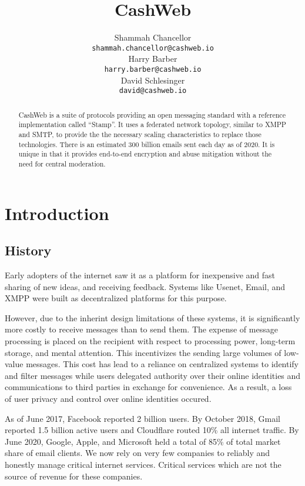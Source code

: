 \documentclass{article}
\title{CashWeb}
\author{
 Shammah Chancellor \\
 \texttt{shammah.chancellor@cashweb.io} \\
 \And
 Harry Barber \\
 \texttt{harry.barber@cashweb.io} \\
 \And
 David Schlesinger \\
 \texttt{david@cashweb.io} \\
}
\begin{document}
\maketitle

\begin{abstract}
CashWeb is a suite of protocols providing an open messaging standard with a reference implementation called ``Stamp''. It uses a federated network topology, similar to XMPP and SMTP, to provide the the necessary scaling characteristics to replace those technologies. There is an estimated 300 billion emails sent each day as of 2020\cite{emailssent2020}. It is unique in that it provides end-to-end encryption and abuse mitigation without the need for central moderation.
\end{abstract}

\section{Introduction}

\subsection{History}

Early adopters of the internet saw it as a platform for inexpensive and fast sharing of new ideas, and receiving feedback. Systems like Usenet\cite{rfc5536}\cite{rfc5537}, Email\cite{rfc5322}\cite{rfc1939}\cite{rfc5321}\cite{rfc4551}, and XMPP\cite{rfc3920}\cite{rfc3921}\cite{rfc3922}\cite{rfc3923} were built as decentralized platforms for this purpose.

However, due to the inherint design limitations of these systems, it is significantly more costly to receive messages than to send them. The expense of message processing is placed on the recipient with respect to processing power, long-term storage, and mental attention. This incentivizes the sending large volumes of low-value messages. This cost has lead to a reliance on centralized systems to identify and filter messages while users delegated authority over their online identities and communications to third parties in exchange for convenience. As a result, a loss of user privacy and control over online identities occured.

As of June 2017, Facebook reported 2 billion users. By October 2018, Gmail reported 1.5 billion active users\cite{gmail2018} and Cloudflare routed 10\% all internet traffic\cite{cloudflare2018}. By June 2020, Google, Apple, and Microsoft held a total of 85\% of total market share of email clients\cite{emailshare2020}. We now rely on very few companies to reliably and honestly manage critical internet services. Critical services which are not the source of revenue for these companies.
\end{document}
